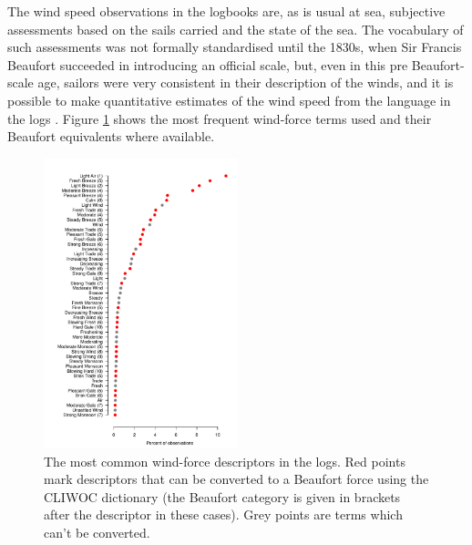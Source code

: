 \documentclass[CP]{copernicus}
\begin{document}
The wind speed observations in the logbooks are, as is usual at sea, subjective assessments based on the sails carried and the state of the sea. The vocabulary of such assessments was not formally standardised until the 1830s, when Sir Francis Beaufort succeeded in introducing an official scale, but, even in this pre Beaufort-scale age, sailors were very consistent in their description of the winds, and it is possible to make quantitative estimates of the wind speed from the language in the logs \citep{cliwoc03dictionary}. Figure \ref{pwat4} shows the most frequent wind-force terms used and their Beaufort equivalents where available.
\begin{figure}[!hbp]
\begin{center}
\includegraphics[angle=0, width=0.5\textwidth]{../figures/wind_term_frequencies}
\caption{The most common wind-force descriptors in the logs. Red points mark descriptors that can be converted to a Beaufort force using the CLIWOC dictionary (the Beaufort category is given in brackets after the descriptor in these cases). Grey points are terms which can't be converted.}
\label{pwat4}
\end{center}
\end{figure}
\end{document}
